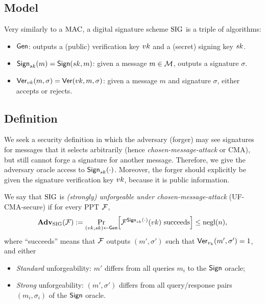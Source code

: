 \documentclass[11pt]{article}
\begin{document}
\subsection{Model}
\label{sec:model}

Very similarly to a $\text{MAC}$, a digital signature scheme $\text{SIG}$ is a
triple of algorithms:

\begin{itemize}
\item $\mathsf{Gen}$: outputs a (public) verification key $vk$ and a
  (secret) signing key $sk$.
\item $\mathsf{Sign}_{sk}(m) = \mathsf{Sign}(sk,m)$: given a message $m \in
  \mathcal{M}$, outputs a signature $\sigma$.
\item $\mathsf{Ver}_{vk}(m,\sigma) = \mathsf{Ver}(vk,m,\sigma)$: given a
  message $m$ and signature $\sigma$, either accepts or rejects.
\end{itemize}

\subsection{Definition}
\label{sec:uf-cma-definition}

We seek a security definition in which the adversary (forger) may see
signatures for messages that it selects arbitrarily (hence
\textit{chosen-message-attack} or CMA), but still cannot forge a
signature for another message.  Therefore, we give the adversary
oracle access to $\mathsf{Sign}_{sk}(\cdot)$.  Moreover, the forger should
explicitly be given the signature verification key $vk$, because it
is public information.

\begin{definition}
  \label{def:uf-cma-sig}
  We say that $\text{SIG}$ is \emph{(strongly) unforgeable under
    chosen-message-attack} (UF-CMA-secure) if for every PPT $\mathcal{F}$,
  \[ \advan_{\sig}(\For) := \Pr_{(\vk,\sk) \gets \siggen}
  \bracks*{\For^{\sigsign_{\sk}(\cdot)}(\vk) \text{ succeeds}} \leq
  \negl(n), \] where ``succeeds'' means that $\mathcal{F}$ outputs $(m' ,
  \sigma')$ such that $\mathsf{Ver}_{v_{k}}(m' , \sigma') = 1$, and either
  \begin{itemize}
  \item \emph{Standard} unforgeability: $m'$ differs from all queries
    $m_{i}$ to the $\mathsf{Sign}$ oracle;
  \item \emph{Strong} unforgeability: $(m', \sigma')$ differs from all
    query/response pairs $(m_{i}, \sigma_{i})$ of the $\mathsf{Sign}$
    oracle.
  \end{itemize}
\end{definition}
\end{document}
